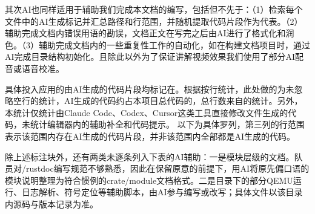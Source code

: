 其次AI也同样适用于辅助我们完成本文档的编写，包括但不先于：（1）检索每个文件中的AI生成标记并汇总路径和行范围，并随机提取代码片段作为代表。（2）辅助完成文档内错误用语的勘误，文档正文在写完之后由AI进行了格式化和润色。（3）辅助完成文档内的一些重复性工作的自动化，如在构建文档项目时，通过AI完成目录结构初始化。且除此以外为了保证讲解视频效果我们使用了部分AI配音或语音校准。

具体投入应用的由AI生成的代码片段均标记在。根据按行统计，此处做的为未忽略空行的统计，AI生成的代码约占本项目总代码的，总行数来自的统计。另外，本统计仅统计由Claude Code、Codex、Cursor这类工具直接修改文件生成的代码，未统计编辑器内的辅助补全和代码提示。
以下为具体罗列，第三列的行范围表示该范围内存在AI生成的代码片段，并非该范围内全部都是AI生成的代码。



除上述标注块外，还有两类未逐条列入下表的AI辅助：一是模块层级的\code{//!}文档。队员对/rustdoc编写规范不够熟悉，因此在保留原意的前提下，用AI将原先偏口语的模块说明整理为符合惯例的crate/module文档格式。二是目录下的部分QEMU运行、日志解析、符号定位等辅助脚本，由AI参与编写或改写；具体文件以该目录内源码与版本记录为准。
